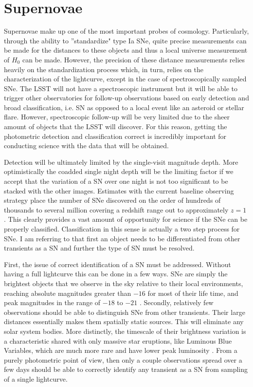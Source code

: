 \documentclass[12pt]{article}
\begin{document}
\section{Supernovae} %
Supernovae make up one of the most important probes of cosmology. Particularly, through the ability to ''standardize" type Ia SNe, quite precise measurements can be made for the distances to these objects and thus a local universe measurement of $H_0$ can be made. However, the precision of these distance measurements relies heavily on the standardization process which, in turn, relies on the characterization of the lightcurve, except in the case of spectroscopically sampled SNe. The LSST will not have a spectroscopic instrument but it will be able to trigger other observatories for follow-up observations based on early detection and broad classification, i.e. SN as opposed to a local event like an asteroid or stellar flare. However, spectroscopic follow-up will be very limited due to the sheer amount of objects that the LSST will discover. For this reason, getting the photometric detection and classification correct is incredibly important for conducting science with the data that will be obtained. \par
Detection will be ultimately limited by the single-visit magnitude depth. More optimistically the coadded single night depth will be the limiting factor if we accept that the variation of a SN over one night is not too significant to be stacked with the other images. Estimates with the current baseline observing strategy place the number of SNe discovered on the order of hundreds of thousands to several million covering a redshift range out to approximately $z=1$ \citep{LSSTScienceCollaboration2017}. This clearly provides a vast amount of opportunity for science if the SNe can be properly classified. Classification in this sense is actually a two step process for SNe. I am referring to that first an object needs to be differentiated from other transients as a SN and further the type of SN must be resolved. \par
First, the issue of correct identification of a SN must be addressed. Without having a full lightcurve this can be done in a few ways. SNe are simply the brightest objects that we observe in the sky relative to their local environments, reaching absolute magnitudes greater than $-16$ for most of their life time, and peak magnitudes in the range of $-18$ to $-21$ \citep{LSSTScienceCollaboration2009}. Secondly, relatively few observations should be able to distinguish SNe from other transients. Their large distances essentially makes them spatially static sources. This will eliminate any solar system bodies. More distinctly, the timescale of their brightness variation is a characteristic shared with only massive star eruptions, like Luminous Blue Variables, which are much more rare and have lower peak luminosity \citep{LSSTScienceCollaboration2017}. From a purely photometric point of view, then only a couple observations spread over a few days should be able to correctly identify any transient as a SN from sampling of a single lightcurve. \par
\end{document}
